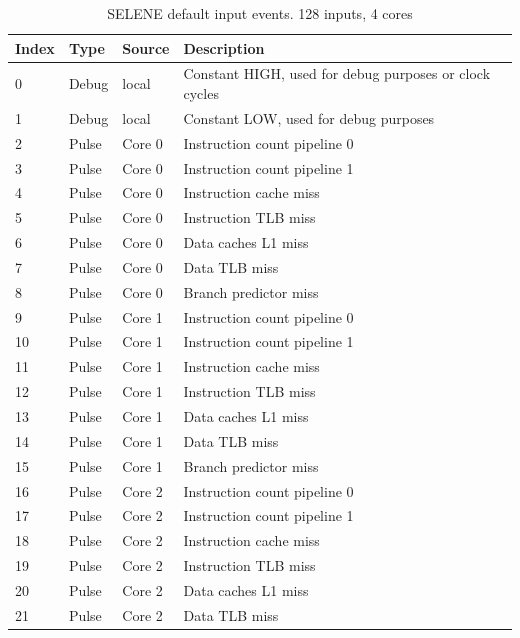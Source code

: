\begin{table}[H]
	\caption{SELENE default input events. 128 inputs, 4 cores}
	\label{table:t_ev}
	\centering
	\begin{footnotesize}
	\begin{tabular}{|l|l|l|l|l|}
		\hline
		\textbf{Index} & \textbf{Type}  & \textbf{Source} & \textbf{Description} \\
	
\hline
0 & Debug & local &  Constant HIGH, used for debug purposes or clock cycles \\
\hline 
1 & Debug & local &  Constant LOW, used for debug purposes \\
\hline 
2 & Pulse & Core 0 &  Instruction count pipeline 0 \\
\hline 
3 & Pulse & Core 0 &  Instruction count pipeline 1 \\
\hline 
4 & Pulse & Core 0 &  Instruction cache miss \\
\hline 
5 & Pulse & Core 0 &  Instruction TLB miss \\
\hline 
6 & Pulse & Core 0 &  Data caches L1 miss \\
\hline 
7 & Pulse & Core 0 &  Data TLB miss \\
\hline 
8 & Pulse & Core 0 &  Branch predictor miss \\
\hline 
9 & Pulse & Core 1 &  Instruction count pipeline 0 \\
\hline 
10 & Pulse & Core 1 &  Instruction count pipeline 1 \\
\hline 
11 & Pulse & Core 1 &  Instruction cache miss \\
\hline 
12 & Pulse & Core 1 &  Instruction TLB miss \\
\hline 
13 & Pulse & Core 1 &  Data caches L1 miss \\
\hline 
14 & Pulse & Core 1 &  Data TLB miss \\
\hline 
15 & Pulse & Core 1 &  Branch predictor miss \\
\hline 
16 & Pulse & Core 2 &  Instruction count pipeline 0 \\
\hline 
17 & Pulse & Core 2 &  Instruction count pipeline 1 \\
\hline 
18 & Pulse & Core 2 &  Instruction cache miss \\
\hline 
19 & Pulse & Core 2 &  Instruction TLB miss \\
\hline 
20 & Pulse & Core 2 &  Data caches L1 miss \\
\hline 
21 & Pulse & Core 2 &  Data TLB miss \\

\end{tabular}
\end{footnotesize}
\end{table}
